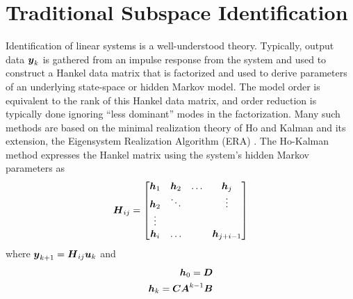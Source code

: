 \section{Traditional Subspace Identification}
Identification of linear systems is a well-understood theory.  Typically, output data $\vb*{y}_{k}$ is gathered from an impulse response from the system and used to construct a Hankel data matrix that is factorized and used to derive parameters of an underlying state-space or hidden Markov model.  The model order is equivalent to the rank of this Hankel data matrix, and order reduction is typically done ignoring ``less dominant'' modes in the factorization.  Many such methods are based on the minimal realization theory of Ho and Kalman \cite{ho1966effective} and its extension, the Eigensystem Realization Algorithm (ERA) \cite{juang1985eigensystem}.  The Ho-Kalman method expresses the Hankel matrix using the system's hidden Markov parameters as
\begin{equation}
\label{eq:hankel_matrix}
\begin{aligned}
    \vb*{H}_{ij} = 
    \begin{bmatrix}
        \vb*{h}_{1} & \vb*{h}_{2} & \ldots & \vb*{h}_{j}\\
        \vb*{h}_{2} & \ddots &  & \vdots\\
        \vdots & & & \\
        \vb*{h}_{i} & \ldots &  & \vb*{h}_{j+i-1}
    \end{bmatrix}
\end{aligned}
\end{equation}
where $\vb*{y}_{k+1} = \vb*{H}_{ij}\vb*{u}_{k}$ and
\begin{equation}
\label{eq:markov_params}
\begin{aligned}
    \vb*{h}_{0} = \vb*{D}\\
    \vb*{h}_{k} = \vb*{C}\vb*{A}^{k-1}\vb*{B}
\end{aligned}
\end{equation}

